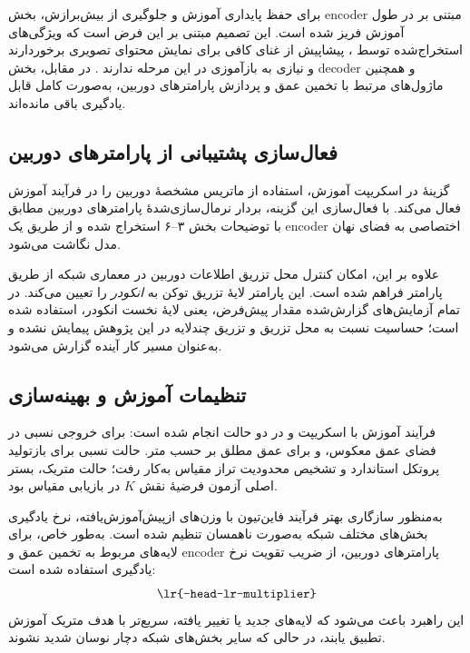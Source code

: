 برای حفظ پایداری آموزش و جلوگیری از بیش‌برازش، بخش encoder مبتنی بر  در طول آموزش فریز شده است. این تصمیم مبتنی بر این فرض است که ویژگی‌های استخراج‌شده توسط ، پیشاپیش از غنای کافی برای نمایش محتوای تصویری برخوردارند و نیازی به بازآموزی در این مرحله ندارند \cite{Oquab2023DINOv2}. در مقابل، بخش decoder و همچنین ماژول‌های مرتبط با تخمین عمق و پردازش پارامترهای دوربین، به‌صورت کامل قابل یادگیری باقی مانده‌اند.

\subsection{فعال‌سازی پشتیبانی از پارامترهای دوربین}

گزینهٔ  در اسکریپت آموزش، استفاده از ماتریس مشخصهٔ دوربین را در فرآیند آموزش فعال می‌کند. با فعال‌سازی این گزینه، بردار نرمال‌سازی‌شدهٔ پارامترهای دوربین مطابق با توضیحات بخش ۳–۶ استخراج شده و از طریق یک encoder اختصاصی به فضای نهان مدل نگاشت می‌شود.

علاوه بر این، امکان کنترل محل تزریق اطلاعات دوربین در معماری شبکه از طریق پارامتر  فراهم شده است. این پارامتر لایهٔ تزریق توکن به \emph{انکودر}  را تعیین می‌کند. در تمام آزمایش‌های گزارش‌شده مقدار پیش‌فرض، یعنی لایهٔ نخست انکودر، استفاده شده است؛ حساسیت نسبت به محل تزریق و تزریق چندلایه در این پژوهش پیمایش نشده و به‌عنوان مسیر کار آینده گزارش می‌شود.

\subsection{تنظیمات آموزش و بهینه‌سازی}

فرآیند آموزش با اسکریپت  و در دو حالت انجام شده است:  برای خروجی نسبی در فضای عمق معکوس، و  برای عمق مطلق بر حسب متر. حالت نسبی برای بازتولید پروتکل استاندارد و تشخیص محدودیت تراز مقیاس به‌کار رفت؛ حالت متریک، بستر اصلی آزمون فرضیهٔ نقش $K$ در بازیابی مقیاس بود.

به‌منظور سازگاری بهتر فرآیند فاین‌تیون با وزن‌های ازپیش‌آموزش‌یافته، نرخ یادگیری بخش‌های مختلف شبکه به‌صورت ناهمسان تنظیم شده است. به‌طور خاص، برای لایه‌های مربوط به تخمین عمق و encoder پارامترهای دوربین، از ضریب تقویت نرخ یادگیری استفاده شده است:
\begin{equation}
\texttt{\lr{--head-lr-multiplier}}
\end{equation}
این راهبرد باعث می‌شود که لایه‌های جدید یا تغییر یافته، سریع‌تر با هدف متریک آموزش تطبیق یابند، در حالی که سایر بخش‌های شبکه دچار نوسان شدید نشوند.

